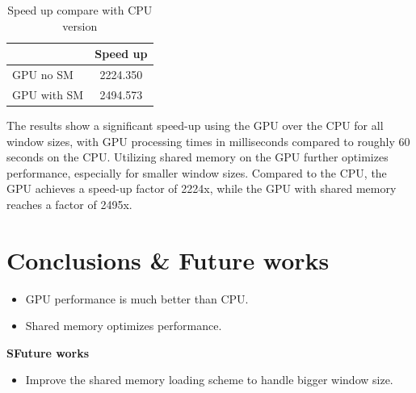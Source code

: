 \documentclass{article}
\begin{document}
\begin{table}[H]
\centering

\begin{tabular}{|l|cl|}
\hline
            & \multicolumn{2}{c|}{Speed   up} \\ \hline
GPU no SM   & \multicolumn{2}{c|}{2224.350}   \\ \hline
GPU with SM & \multicolumn{2}{c|}{2494.573}   \\ \hline
\end{tabular}%

\caption{Speed up compare with CPU version}
\label{tab:my-table}
\end{table}


The results show a significant speed-up using the GPU over the CPU for all window sizes, with GPU processing times in milliseconds compared to roughly 60 seconds on the CPU.
Utilizing shared memory on the GPU further optimizes performance, especially for smaller window sizes.
Compared to the CPU, the GPU achieves a speed-up factor of 2224x, while the GPU with shared memory reaches a factor of 2495x.


\section{Conclusions & Future works}
\begin{itemize}
    \item GPU performance is much better than CPU.
    \item Shared memory optimizes performance.
\end{itemize}

\textbf{SFuture works}
\begin{itemize}
    \item Improve the shared memory loading scheme to handle bigger window size.
\end{itemize}
\end{document}
